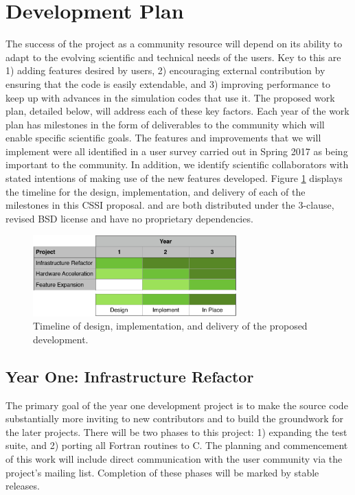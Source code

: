 \section{Development Plan}

The success of the \grackle{} project as a community resource will
depend on its ability to adapt to the evolving scientific and
technical needs of the users. Key to this are 1) adding features
desired by users, 2) encouraging external contribution by ensuring
that the code is easily extendable, and 3) improving performance to
keep up with advances in the simulation codes that use it.
The proposed work plan, detailed below, will address each of these key
factors. Each year of the work plan has milestones in the form of
deliverables to the community which will enable specific scientific
goals. The features and improvements that we will implement were all
identified in a \grackle{} user survey carried out in Spring 2017 as
being important to the community. In addition, we identify scientific
collaborators with stated intentions of making use of the new features
developed. Figure \ref{fig:gantt} displays the timeline for the
design, implementation, and delivery of each of the milestones in this
CSSI proposal. \grackle{} and \dengo{} are both distributed under the
3-clause, revised BSD license and have no proprietary dependencies.

\begin{figure}
\begin{center}
\includegraphics[width=0.7\textwidth]{figures/gantt.pdf}
\caption{Timeline of design, implementation, and delivery of the
  proposed development.}
\label{fig:gantt}
\end{center}
\vspace*{-2\baselineskip}
\end{figure}

\subsection{Year One: Infrastructure Refactor}

The primary goal of the year one development project is to make the
source code substantially more inviting to new contributors and to
build the groundwork for the later projects.  There will be two phases
to this project: 1) expanding the test suite, and 2) porting all
Fortran routines to C.  The planning and commencement of this work
will include direct communication with the \grackle{} user community
via the project's mailing list.  Completion of these phases will be
marked by stable releases.

